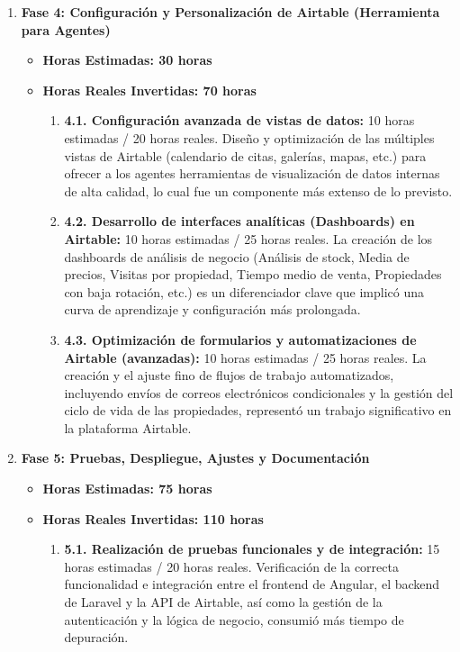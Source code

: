 \begin{enumerate}
    \item \textbf{Fase 4: Configuración y Personalización de Airtable (Herramienta para Agentes)}
    \begin{itemize}
        \item \textbf{Horas Estimadas: 30 horas}
        \item \textbf{Horas Reales Invertidas: 70 horas}
        \begin{enumerate}
            \item \textbf{4.1. Configuración avanzada de vistas de datos:} 10 horas estimadas / 20 horas reales. Diseño y optimización de las múltiples vistas de Airtable (calendario de citas, galerías, mapas, etc.) para ofrecer a los agentes herramientas de visualización de datos internas de alta calidad, lo cual fue un componente más extenso de lo previsto.
            \item \textbf{4.2. Desarrollo de interfaces analíticas (Dashboards) en Airtable:} 10 horas estimadas / 25 horas reales. La creación de los dashboards de análisis de negocio (Análisis de stock, Media de precios, Visitas por propiedad, Tiempo medio de venta, Propiedades con baja rotación, etc.) es un diferenciador clave que implicó una curva de aprendizaje y configuración más prolongada.
            \item \textbf{4.3. Optimización de formularios y automatizaciones de Airtable (avanzadas):} 10 horas estimadas / 25 horas reales. La creación y el ajuste fino de flujos de trabajo automatizados, incluyendo envíos de correos electrónicos condicionales y la gestión del ciclo de vida de las propiedades, representó un trabajo significativo en la plataforma Airtable.
        \end{enumerate}
    \end{itemize}
    \item \textbf{Fase 5: Pruebas, Despliegue, Ajustes y Documentación}
    \begin{itemize}
        \item \textbf{Horas Estimadas: 75 horas}
        \item \textbf{Horas Reales Invertidas: 110 horas}
        \begin{enumerate}
            \item \textbf{5.1. Realización de pruebas funcionales y de integración:} 15 horas estimadas / 20 horas reales. Verificación de la correcta funcionalidad e integración entre el frontend de Angular, el backend de Laravel y la API de Airtable, así como la gestión de la autenticación y la lógica de negocio, consumió más tiempo de depuración.

\end{enumerate}
\end{itemize}
\end{enumerate}
